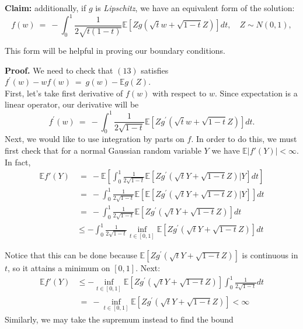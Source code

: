 \documentclass[12pt]{article}
\newcommand{\e}{\mathbb{E}}
\newcommand{\eq }{\: = \:}
\theoremstyle{nonumberplain}
\begin{document}
\medskip
\noindent
\textbf{Claim:} additionally, if $g$ is {\it Lipschitz\/}, we have an equivalent form of the solution:
\begin{equation}
f(w)\eq -\int_{0}^{1} \frac{1}{2\sqrt{t(1-t)}} \mathbb{E}[Zg(\sqrt{t}w+\sqrt{1-t}Z)]dt, \quad Z\sim N(0,1),
\end{equation}

This form will be helpful in proving our boundary conditions.

\noindent
\textbf{Proof.} We need to check that $(13)$ satisfies $f^{\prime}(w)-wf(w)\eq g(w)-\mathbb{E}g(Z)$.\\
First, let's take first derivative of $f(w)$ with respect to $w$. Since expectation is a linear operator, our derivative will be
$$
f^{\prime}(w)\eq -\int_{0}^{1} \frac{1}{2\sqrt{1-t}} \mathbb{E}[Zg^{\prime}(\sqrt{t}w+\sqrt{1-t}Z)]dt.
$$
Next, we would like to use integration by parts on $f$. In order to do this, we must first check that for a normal Gaussian random variable $Y$ we have $\e |f'(Y)| < \infty$. In fact,
\begin{align*}
\e f'(Y) &\eq -\e \left[ \int_{0}^{1} \frac{1}{2\sqrt{1-t}} \mathbb{E}[Zg^{\prime}(\sqrt{t}Y+\sqrt{1-t}Z)|Y]dt \right] \\
&\eq - \int_{0}^{1} \frac{1}{2\sqrt{1-t}} \e \left[ \mathbb{E}[Zg^{\prime}(\sqrt{t}Y+\sqrt{1-t}Z)|Y] \right]dt \\
&\eq - \int_{0}^{1} \frac{1}{2\sqrt{1-t}} \e [Zg^{\prime}(\sqrt{t}Y+\sqrt{1-t}Z)]dt \\
&\le - \int_{0}^{1} \frac{1}{2\sqrt{1-t}} \inf \limits_{t \in [0, 1]} \e  [Zg^{\prime}(\sqrt{t}Y+\sqrt{1-t}Z)]dt
\end{align*}

Notice that this can be done because $\e  [Zg^{\prime}(\sqrt{t}Y+\sqrt{1-t}Z)]$ is continuous in $t$, so it attains a minimum on $[0, 1]$. Next:
\begin{align*}
\e f'(Y) &\le - \inf \limits_{t \in [0, 1]} \e  [Zg^{\prime}(\sqrt{t}Y+\sqrt{1-t}Z)] \int_{0}^{1} \frac{1}{2\sqrt{1-t}} dt \\
&\eq - \inf \limits_{t \in [0, 1]} \e  [Zg^{\prime}(\sqrt{t}Y+\sqrt{1-t}Z)] < \infty
\end{align*}
Similarly, we may take the supremum instead to find the bound
\end{document}
